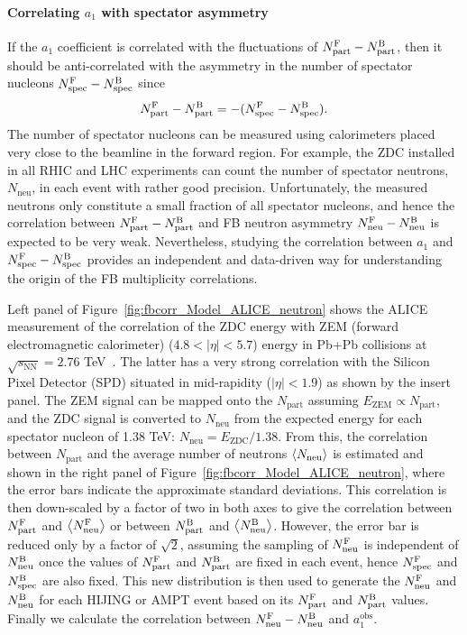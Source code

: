 \paragraph{Correlating $a_1$ with spectator asymmetry}

If the $a_1$ coefficient is correlated with the fluctuations of $N_\text{part}^\text{F} - N_\text{part}^\text{B}$, then it should be anti-correlated with the asymmetry in the number of spectator nucleons $N_\text{spec}^\text{F} - N_\text{spec}^\text{B}$ since
\begin{equation}
N_\text{part}^\text{F} - N_\text{part}^\text{B} = - (N_\text{spec}^\text{F} - N_\text{spec}^\text{B}).
\end{equation}
The number of spectator nucleons can be measured using calorimeters placed very close to the beamline in the forward region. For example, the ZDC installed in all RHIC and LHC experiments can count the number of spectator neutrons, $N_\text{neu}$, in each event with rather good precision. Unfortunately, the measured neutrons only constitute a small fraction of all spectator nucleons, and hence the correlation between $N_\text{part}^\text{F} - N_\text{part}^\text{B}$ and FB neutron asymmetry $N_\text{neu}^\text{F} - N_\text{neu}^\text{B}$ is expected to be very weak. Nevertheless, studying the correlation between $a_1$ and $N_\text{spec}^\text{F} - N_\text{spec}^\text{B}$ provides an independent and data-driven way for understanding the origin of the FB multiplicity correlations.

Left panel of Figure~\ref{fig:fbcorr_Model_ALICE_neutron} shows the ALICE measurement of the correlation of the ZDC energy with ZEM (forward electromagnetic calorimeter) ($4.8 < |\eta| < 5.7$) energy in Pb+Pb collisions at $\sqrt{s_\text{NN}}=2.76$ TeV~\cite{Abelev:2013qoq}. The latter has a very strong correlation with the Silicon Pixel Detector (SPD) situated in mid-rapidity ($|\eta|<1.9$) as shown by the insert panel. The ZEM signal can be mapped onto the $N_\text{part}$ assuming $E_\text{ZEM} \propto N_\text{part}$, and the ZDC signal is converted to $N_\text{neu}$ from the expected energy for each spectator nucleon of 1.38 TeV: $N_\text{neu} = E_\text{ZDC}/1.38$. From this, the correlation between $N_\text{part}$ and the average number of neutrons $\left\langle N_\text{neu}\right\rangle$ is estimated and shown in the right panel of Figure~\ref{fig:fbcorr_Model_ALICE_neutron}, where the error bars indicate the approximate standard deviations. This correlation is then down-scaled by a factor of two in both axes to give the correlation between $N_\text{part}^\text{F}$ and $\left\langle N_\text{neu}^\text{F}\right\rangle$ or between $N_\text{part}^\text{B}$ and $\left\langle N_\text{neu}^\text{B}\right\rangle$. However, the error bar is reduced only by a factor of $\sqrt{2}$, assuming the sampling of $N_\text{neu}^\text{F}$ is independent of $N_\text{neu}^\text{B}$ once the values of $N_\text{part}^\text{F}$ and $N_\text{part}^\text{B}$ are fixed in each event, hence $N_\text{spec}^\text{F}$ and $N_\text{spec}^\text{B}$ are also fixed. This new distribution is then used to generate the $N_\text{neu}^\text{F}$ and $N_\text{neu}^\text{B}$ for each HIJING or AMPT event based on its $N_\text{part}^\text{F}$ and $N_\text{part}^\text{B}$ values. Finally we calculate the correlation between $N_\text{neu}^\text{F} - N_\text{neu}^\text{B}$ and $a_1^\text{obs}$.

